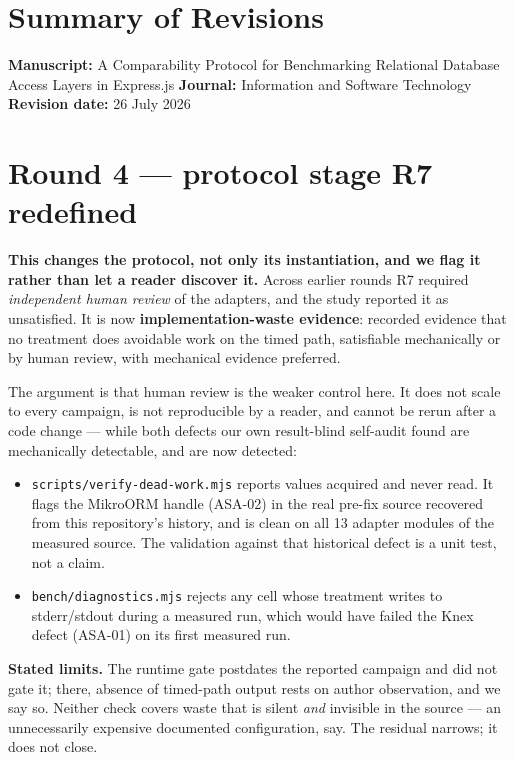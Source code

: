 \documentclass[11pt,a4paper]{article}
\begin{document}
\section*{Summary of Revisions}

\textbf{Manuscript:} A Comparability Protocol for Benchmarking Relational Database Access Layers in Express.js \textbf{Journal:} Information and Software Technology \textbf{Revision date:} 26 July 2026

\section*{Round 4 --- protocol stage R7 redefined}

\textbf{This changes the protocol, not only its instantiation, and we flag it rather than let a reader discover it.} Across earlier rounds R7 required \emph{independent human review} of the adapters, and the study reported it as unsatisfied. It is now \textbf{implementation-waste evidence}: recorded evidence that no treatment does avoidable work on the timed path, satisfiable mechanically or by human review, with mechanical evidence preferred.

The argument is that human review is the weaker control here. It does not scale to every campaign, is not reproducible by a reader, and cannot be rerun after a code change --- while both defects our own result-blind self-audit found are mechanically detectable, and are now detected:

\begin{itemize}
  \item \texttt{scripts/verify-dead-work.mjs} reports values acquired and never read. It flags the MikroORM handle (ASA-02) in the real pre-fix source recovered from this repository's history, and is clean on all 13 adapter modules of the measured source. The validation against that historical defect is a unit test, not a claim.
  \item \texttt{bench/diagnostics.mjs} rejects any cell whose treatment writes to stderr/stdout during a measured run, which would have failed the Knex defect (ASA-01) on its first measured run.
\end{itemize}

\textbf{Stated limits.} The runtime gate postdates the reported campaign and did not gate it; there, absence of timed-path output rests on author observation, and we say so. Neither check covers waste that is silent \emph{and} invisible in the source --- an unnecessarily expensive documented configuration, say. The residual narrows; it does not close.
\end{document}
